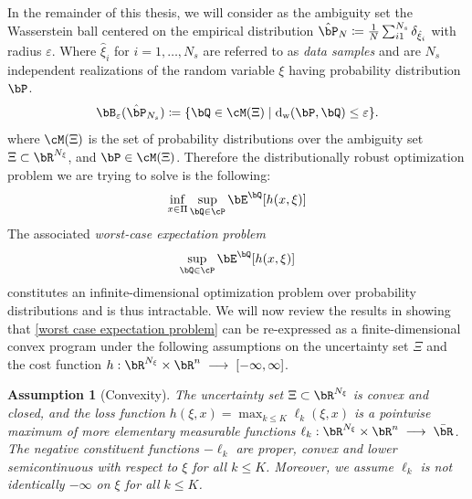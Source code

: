 \documentclass[11pt,a4paper,oneside,openany]{book}
\DeclareMathOperator{\dw}{d_w}
\newtheorem{assumption}{Assumption}
\numberwithin{definition}{section}
\numberwithin{theorem}{section}
\numberwithin{problem}{section}
\newcommand{\la}{\; \longrightarrow \;}
\begin{document}
In the remainder of this thesis, we will consider as the ambiguity set the Wasserstein ball centered on the empirical distribution $\hat \bP_N \coloneqq \frac{1}{N}\sum_{i1 }^{N_s} \delta_{\hat \xi_i}$ with radius $\varepsilon$. Where $\hat \xi_i$ for $i = 1,\ldots, N_s$ are referred to as \emph{data samples} and are $N_s$ independent realizations of the random variable $\xi$ having probability distribution $\bP$.
\begin{equation}
    \bB_{\varepsilon}(\hat \bP_{N_s}) \coloneqq \{\bQ \in \cM(\Xi) \mid \dw(\bP,\bQ) \leq \varepsilon\}.
\end{equation}
where $\cM(\Xi)$ is the set of probability distributions over the ambiguity set $\Xi \subset \bR^{N_{\xi}}$, and $\bP \in \cM(\Xi)$. Therefore the distributionally robust optimization problem we are trying to solve is the following:
\begin{equation}\label{DRO}
    \inf_{x \in \Pi}\sup_{\bQ \in \cP}\bE^{\bQ}[h(x,\xi)]
\end{equation}
The associated \emph{worst-case expectation problem} 
\begin{equation}\label{worst case expectation problem}
    \sup_{\bQ \in \cP}\bE^{\bQ}[h(x,\xi)]
\end{equation} 
constitutes an infinite-dimensional optimization problem over probability distributions and is thus intractable. We will now review the results in \cite{distibRobWasserstein} showing that \eqref{worst case expectation problem} can be re-expressed as a finite-dimensional convex program under the following assumptions
on the uncertainty set $\Xi$ and the cost function $h:\bR^{N_{\xi}} \times \bR^n \la [-\infty,\infty]$.




\begin{assumption}[Convexity] \label{convex ass}
    The uncertainty set $\Xi \subset \bR^{N_{\xi}}$ is convex and closed,
and the loss function $h(\xi,x) = \max_{k \leq K}\ell_k(\xi,x)$ is a pointwise maximum of more elementary measurable functions  $\ell_k: \bR^{N_{\xi}} \times \bR^n \la \bar \bR$. The negative constituent functions $-\ell_k$ are proper, convex and lower semicontinuous with respect to $\xi$ for all $k \leq K$. Moreover, we assume $\ell_k$ is not identically $-\infty$ on $\xi$ for all $k \leq K$.
\end{assumption}
\end{document}
